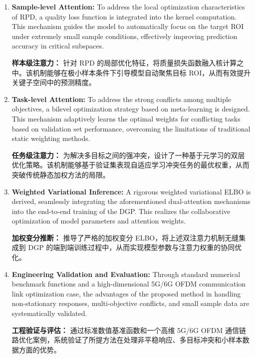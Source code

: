 \documentclass[11pt]{article}
\begin{document}
\begin{enumerate}[label=(\arabic*), wide, labelwidth=!, labelindent=0pt]
	\item \textbf{Sample-level Attention:} To address the local optimization characteristics of RPD, a quality loss function is integrated into the kernel computation. This mechanism guides the model to automatically focus on the target ROI under extremely small sample conditions, effectively improving prediction accuracy in critical subspaces.
	
	\textbf{样本级注意力：} 针对 RPD 的局部优化特征，将质量损失函数融入核计算之中。该机制能够在极小样本条件下引导模型自动聚焦目标 ROI，从而有效提升关键子空间中的预测精度。
	
	\item \textbf{Task-level Attention:} To address the strong conflicts among multiple objectives, a bilevel optimization strategy based on meta-learning is designed. This mechanism adaptively learns the optimal weights for conflicting tasks based on validation set performance, overcoming the limitations of traditional static weighting methods.
	
	\textbf{任务级注意力：} 为解决多目标之间的强冲突，设计了一种基于元学习的双层优化策略。该机制能够基于验证集表现自适应学习冲突任务的最优权重，从而突破传统静态加权方法的局限。
	
	\item \textbf{Weighted Variational Inference:} A rigorous weighted variational ELBO is derived, seamlessly integrating the aforementioned dual-attention mechanisms into the end-to-end training of the DGP. This realizes the collaborative optimization of model parameters and attention weights.
	
	\textbf{加权变分推断：} 推导了严格的加权变分 ELBO，将上述双注意力机制无缝集成到 DGP 的端到端训练过程中，从而实现模型参数与注意力权重的协同优化。
	
	\item \textbf{Engineering Validation and Evaluation:} Through standard numerical benchmark functions and a high-dimensional 5G/6G OFDM communication link optimization case, the advantages of the proposed method in handling non-stationary responses, multi-objective conflicts, and small sample data are systematically validated.
	
	\textbf{工程验证与评估：} 通过标准数值基准函数和一个高维 5G/6G OFDM 通信链路优化案例，系统验证了所提方法在处理非平稳响应、多目标冲突和小样本数据方面的优势。
\end{enumerate}
\end{document}
